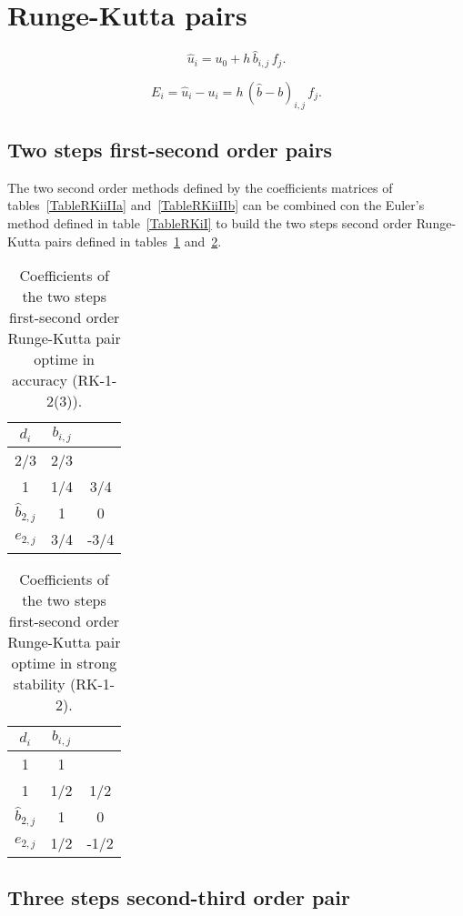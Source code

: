 \documentclass[a4paper]{article}
\newcommand{\EQ}[2]{\begin{equation}#1\label{#2}\end{equation}}
\newcommand{\PA}[1]{\left(#1\right)}
\begin{document}
\section{Runge-Kutta pairs}

\EQ{\hat{u}_i=u_0+h\,\hat{b}_{i,j}\,f_j.}{EqRKpair}

\EQ{E_i=\hat{u}_i-u_i=h\,\PA{\hat{b}-b}_{i,j}\,f_j.}{EqRKpairE}

\subsection{Two steps first-second order pairs}

The two second order methods defined by the coefficients matrices of
tables~\ref{TableRKiiIIa} and~\ref{TableRKiiIIb} can be combined con the
Euler's method defined in table~\ref{TableRKiI} to build the two steps second
order Runge-Kutta pairs defined in tables~\ref{TableRKIiiIIa}
and~\ref{TableRKIiiIIb}.
\begin{table}[ht]
	\centering
	\begin{tabular}{c|cc}
		$d_{i}$ & $b_{i,j}$ \\ \hline
		2/3 & 2/3 \\
		1 & 1/4 & 3/4 \\ \hline
		$\hat{b}_{2,j}$ & 1 & 0 \\ \hline
		$e_{2,j}$ & 3/4 & -3/4
	\end{tabular}
	\caption{Coefficients of the two steps first-second order Runge-Kutta pair
		optime in accuracy (RK-1-2(3)).\label{TableRKIiiIIa}}
\end{table}
\begin{table}[ht]
	\centering
	\begin{tabular}{c|cc}
		$d_{i}$ & $b_{i,j}$ \\ \hline
		1 & 1 \\
		1 & 1/2 & 1/2 \\ \hline
		$\hat{b}_{2,j}$ & 1 & 0 \\ \hline
		$e_{2,j}$ & 1/2 & -1/2
	\end{tabular}
	\caption{Coefficients of the two steps first-second order Runge-Kutta pair
		optime in strong stability (RK-1-2).\label{TableRKIiiIIb}}
\end{table}

\subsection{Three steps second-third order pair}
\end{document}
